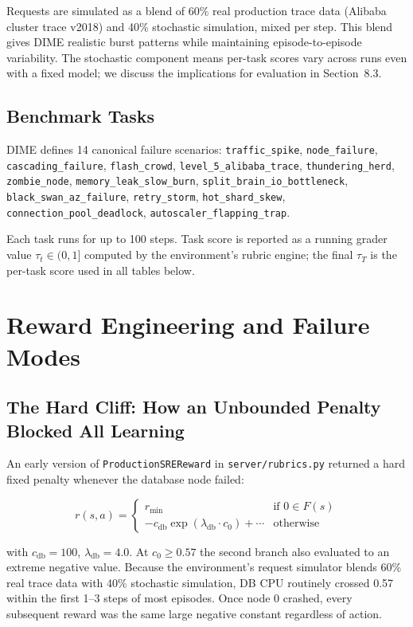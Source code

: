 \documentclass{article}
\begin{document}
Requests are simulated as a blend of 60\% real production trace data (Alibaba cluster
trace v2018) and 40\% stochastic simulation, mixed per step. This blend gives DIME
realistic burst patterns while maintaining episode-to-episode variability. The
stochastic component means per-task scores vary across runs even with a fixed model; we
discuss the implications for evaluation in Section~8.3.

\subsection{Benchmark Tasks}

DIME defines 14 canonical failure scenarios:
\texttt{traffic\_spike}, \texttt{node\_failure}, \texttt{cascading\_failure},
\texttt{flash\_crowd}, \texttt{level\_5\_alibaba\_trace}, \texttt{thundering\_herd},
\texttt{zombie\_node}, \texttt{memory\_leak\_slow\_burn},
\texttt{split\_brain\_io\_bottleneck}, \texttt{black\_swan\_az\_failure},
\texttt{retry\_storm}, \texttt{hot\_shard\_skew},
\texttt{connection\_pool\_deadlock}, \texttt{autoscaler\_flapping\_trap}.

Each task runs for up to 100 steps. Task score is reported as a running grader value
$\tau_t \in (0, 1]$ computed by the environment's rubric engine; the final $\tau_T$ is
the per-task score used in all tables below.

\section{Reward Engineering and Failure Modes}

\subsection{The Hard Cliff: How an Unbounded Penalty Blocked All Learning}

An early version of \texttt{ProductionSREReward} in \texttt{server/rubrics.py} returned
a hard fixed penalty whenever the database node failed:

\[
r(s, a) = \begin{cases} r_{\min} & \text{if } 0 \in F(s) \\ -c_{\mathrm{db}} \exp(\lambda_{\mathrm{db}} \cdot c_0) + \cdots & \text{otherwise} \end{cases}
\]

with $c_{\mathrm{db}} = 100$, $\lambda_{\mathrm{db}} = 4.0$.
At $c_0 \geq 0.57$ the second branch also evaluated to an extreme negative value.
Because the environment's request simulator blends 60\% real trace data with 40\%
stochastic simulation, DB CPU routinely crossed 0.57 within the first 1--3 steps of
most episodes. Once node 0 crashed, every subsequent reward was the same large
negative constant regardless of action.
\end{document}
